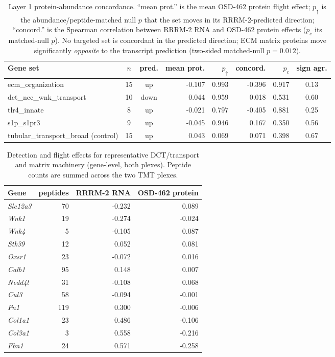 \documentclass[11pt]{article}
\begin{document}
\begin{table}[htbp]
\centering
\small
\begin{tabular}{lccrrrrc}
\toprule
Gene set & $n$ & pred. & mean prot. & $p_{\uparrow}$ & concord. & $p_{c}$ & sign agr. \\
\midrule
ecm\_organization & 15 & up & -0.107 & 0.993 & -0.396 & 0.917 & 0.13 \\
dct\_ncc\_wnk\_transport & 10 & down & 0.044 & 0.959 & 0.018 & 0.531 & 0.60 \\
tlr4\_innate & 8 & up & -0.021 & 0.797 & -0.405 & 0.881 & 0.25 \\
s1p\_s1pr3 & 9 & up & -0.045 & 0.946 & 0.167 & 0.350 & 0.56 \\
tubular\_transport\_broad (control) & 15 & up & 0.043 & 0.069 & 0.071 & 0.398 & 0.67 \\
\bottomrule
\end{tabular}
\caption{Layer 1 protein-abundance concordance. ``mean prot.'' is the mean OSD-462 protein flight effect; $p_\uparrow$ is the abundance/peptide-matched null $p$ that the set moves in its RRRM-2-predicted direction; ``concord.'' is the Spearman correlation between RRRM-2 RNA and OSD-462 protein effects ($p_c$ its matched-null $p$). No targeted set is concordant in the predicted direction; ECM matrix proteins move significantly \emph{opposite} to the transcript prediction (two-sided matched-null $p=0.012$).}
\label{tab:layer1}
\end{table}

\begin{table}[htbp]
\centering
\small
\begin{tabular}{lrrr}
\toprule
Gene & peptides & RRRM-2 RNA & OSD-462 protein \\
\midrule
\textit{Slc12a3} & 70 & -0.232 & 0.089 \\
\textit{Wnk1} & 19 & -0.274 & -0.024 \\
\textit{Wnk4} & 5 & -0.105 & 0.087 \\
\textit{Stk39} & 12 & 0.052 & 0.081 \\
\textit{Oxsr1} & 23 & -0.072 & 0.016 \\
\textit{Calb1} & 95 & 0.148 & 0.007 \\
\textit{Nedd4l} & 31 & -0.108 & 0.068 \\
\textit{Cul3} & 58 & -0.094 & -0.001 \\
\textit{Fn1} & 119 & 0.300 & -0.006 \\
\textit{Col1a1} & 23 & 0.486 & -0.106 \\
\textit{Col3a1} & 3 & 0.558 & -0.216 \\
\textit{Fbn1} & 24 & 0.571 & -0.258 \\
\bottomrule
\end{tabular}
\caption{Detection and flight effects for representative DCT/transport and matrix machinery (gene-level, both plexes). Peptide counts are summed across the two TMT plexes.}
\label{tab:detect}
\end{table}
\end{document}

